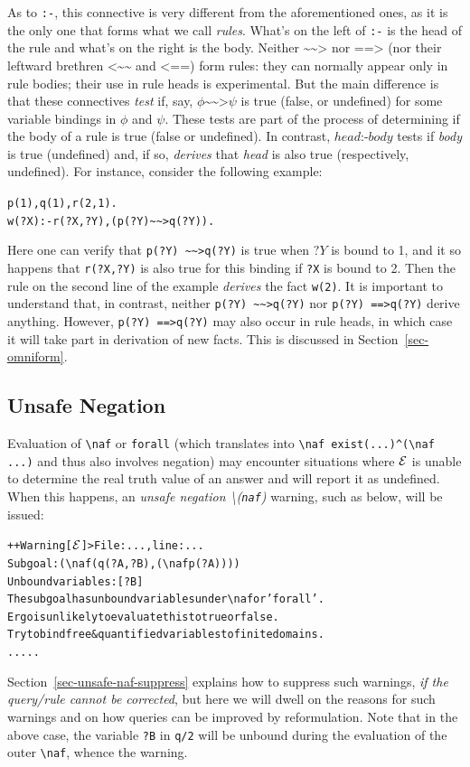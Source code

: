 \documentclass[11pt]{article}
\newcommand{\ERGO}{\mbox{\ensuremath{\cal{E}}\smaller{{\sc{RGO}}}}\xspace}
\newcommand{\FLSYSTEM}{\ERGO}
\newcommand{\rnafarr}{\texttt{\textasciitilde\textasciitilde>}}
\newcommand{\lnafarr}{\texttt{<\textasciitilde\textasciitilde}}
\newcommand{\rnegarr}{\texttt{==>}}
\newcommand{\lnegarr}{\texttt{<==}}
\newcommand{\bs}{\textbackslash}
\begin{document}
As to \texttt{:-}, this connective is very different from the
aforementioned ones, as it is the only one that forms what we call
\emph{rules}. What's on the left of \texttt{:-} is the head of the rule and
what's on the right is the body. Neither  $\rnafarr $ nor $\rnegarr $ (nor
their leftward brethren $\lnafarr$ and $\lnegarr$)
form rules: they can normally appear only in rule bodies; their use in rule
heads is experimental.
But the main difference is
that these connectives \emph{test} if, say, $\phi \rnafarr
\psi$ is true (false, or undefined) for some variable bindings in $\phi$ and
$\psi$. These tests are part
of the process of determining if the body of a rule is true (false or
undefined).
In contrast, $head \texttt{:-} body$ tests if \textit{body} is true (undefined) and, if so, \emph{derives} that \emph{head} is also true (respectively,
undefined). For instance, consider the following example:
\begin{alltt}
   p(1), q(1), r(2,1).
   w(?X) :- r(?X,?Y), (p(?Y) \rnafarr q(?Y)).
\end{alltt}
Here one can verify that \texttt{p(?Y) \rnafarr q(?Y)} is true when $?Y$
is bound to 1, and it so happens that \texttt{r(?X,?Y)} is also true for
this binding if \texttt{?X} is bound to 2. Then the rule on the second
line of the example \emph{derives} the fact \texttt{w(2)}.
It is important
to understand that, in contrast, neither \texttt{p(?Y) \rnafarr q(?Y)} nor
\texttt{p(?Y) \rnegarr q(?Y)}  derive anything.
However, \texttt{p(?Y) \rnegarr q(?Y)} may also occur in rule heads,
in which case it will take part in derivation of new facts. This is
discussed in Section~\ref{sec-omniform}.

\subsection{Unsafe Negation} \label{sec-unsafe-negation}

\index{\bs{}naf!unsafe}
\index{unsafe \bs{}naf}
Evaluation of \texttt{\bs{}naf} or \texttt{forall}  (which translates into
\verb|\naf exist(...)^(\naf ...)| and thus also involves negation)
may encounter situations where \FLSYSTEM is
unable to determine the real truth value of an answer and will report it as
undefined. When this happens, an
\emph{unsafe negation \bs{}(\texttt{naf})} warning,
such as below, will be issued:
\begin{alltt}
  ++Warning[\FLSYSTEM]> File: ..., line: ...
		   Subgoal: (\bs{}naf (q(?A,?B), (\bs{}naf p(?A))))
		   Unbound variables: [?B]
		   The subgoal has unbound variables under \bs{}naf or 'forall'.
		   Ergo is unlikely to evaluate this to true or false.
		   Try to bind free & quantified variables to finite domains.
                   .....

\end{alltt}
Section~\ref{sec-unsafe-naf-suppress} explains how to suppress such warnings,
\emph{if the query/rule cannot be corrected}, but here we will dwell on the
reasons for such warnings and on how queries can be improved by
reformulation.
Note that in
the above case, the variable \texttt{?B} in \texttt{q/2} will be unbound
during the evaluation of the outer \texttt{\bs{}naf}, whence the warning. 
\end{document}
